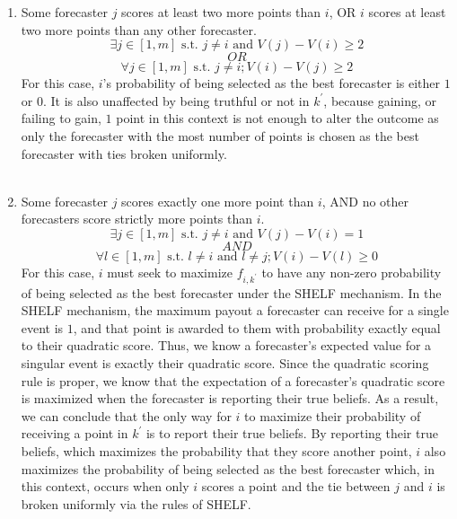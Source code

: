 \documentclass[letterpaper,12pt]{article}
\newcommand{\1}{\mathbbm{1}}
\begin{document}
\begin{enumerate}
    \item Some forecaster $j$ scores at least two more points than $i$, OR $i$ scores at least two more points than any other forecaster.\\
    $$\exists j \in [1,m] \text{ s.t. } j \ne i \text{ and } V(j) - V(i) \geq 2$$ 
    $$OR$$
    $$\forall j \in [1,m] \text{ s.t. } j \ne i; V(i) - V(j) \geq 2$$
    For this case, $i$'s probability of being selected as the best forecaster is either $1$ or $0$. It is also unaffected by being truthful or not in $k^\prime$, because gaining, or failing to gain, $1$ point in this context is not enough to alter the outcome as only the forecaster with the most number of points is chosen as the best forecaster with ties broken uniformly.\\\\
    
    \item Some forecaster $j$ scores exactly one more point than $i$, AND no other forecasters score strictly more points than $i$.\\
    $$\exists j \in [1,m] \text{ s.t. } j \neq i \text{ and } V(j) - V(i) = 1$$
    $$AND$$
    $$\forall l \in [1,m] \text{ s.t. } l \neq i \text{ and } l \neq j; V(i) - V(l) \geq 0$$
    For this case, $i$ must seek to maximize $f_{i,k^\prime}$ to have any non-zero probability of being selected as the best forecaster under the SHELF mechanism. 
    In the SHELF mechanism, the maximum payout a forecaster can receive for a single event is $1$, and that point is awarded to them with probability exactly equal to their quadratic score. Thus, we know a forecaster's expected value for a singular event is exactly their quadratic score. Since the quadratic scoring rule is proper, we know that the expectation of a forecaster's quadratic score is maximized when the forecaster is reporting their true beliefs. As a result, we can conclude that the only way for $i$ to maximize their probability of receiving a point in $k^\prime$ is to report their true beliefs. By reporting their true beliefs, which maximizes the probability that they score another point, $i$ also maximizes the probability of being selected as the best forecaster which, in this context, occurs when only $i$ scores a point and the tie between $j$ and $i$ is broken uniformly via the rules of SHELF.
    

\end{enumerate}
\end{document}
